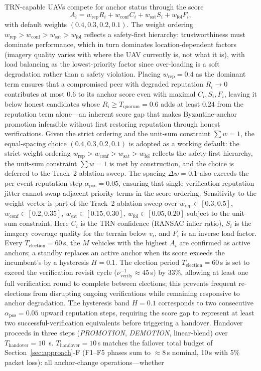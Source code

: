 \documentclass[conference,10pt]{IEEEtran}
\begin{document}
TRN-capable UAVs compete for anchor status through the score
\begin{equation}
A_i = w_\text{rep} R_i + w_\text{conf} C_i + w_\text{sat} S_i + w_\text{fol} F_i,
\label{eq:anchor_score}
\end{equation}
with default weights $(0.4, 0.3, 0.2, 0.1)$. The weight ordering $w_\text{rep} > w_\text{conf} > w_\text{sat} > w_\text{fol}$ reflects a safety-first hierarchy: trustworthiness must dominate performance, which in turn dominates location-dependent factors (imagery quality varies with where the UAV currently is, not what it is), with load balancing as the lowest-priority factor since over-loading is a soft degradation rather than a safety violation. Placing $w_\text{rep}=0.4$ as the dominant term ensures that a compromised peer with degraded reputation $R_i\to 0$ contributes at most $0.6$ to its anchor score even with maximal $C_i, S_i, F_i$, leaving it below honest candidates whose $R_i\geq T_\text{quorum}=0.6$ adds at least $0.24$ from the reputation term alone---an inherent score gap that makes Byzantine-anchor promotion infeasible without first restoring reputation through honest verifications. Given the strict ordering and the unit-sum constraint $\sum w = 1$, the equal-spacing choice $(0.4, 0.3, 0.2, 0.1)$ is adopted as a working default: the strict weight ordering $w_\text{rep} > w_\text{conf} > w_\text{sat} > w_\text{fol}$ reflects the safety-first hierarchy, the unit-sum constraint $\sum w = 1$ is met by construction, and the choice is deferred to the Track~2 ablation sweep. The spacing $\Delta w = 0.1$ also exceeds the per-event reputation step $\alpha_\text{pos}=0.05$, ensuring that single-verification reputation jitter cannot swap adjacent priority terms in the score ordering. Sensitivity to the weight vector is part of the Track~2 ablation sweep over $w_\text{rep}\in[0.3, 0.5]$, $w_\text{conf}\in[0.2, 0.35]$, $w_\text{sat}\in[0.15, 0.30]$, $w_\text{fol}\in[0.05, 0.20]$ subject to the unit-sum constraint. Here $C_i$ is the TRN confidence (RANSAC inlier ratio), $S_i$ is the imagery coverage quality for the terrain below $v_i$, and $F_i$ is an inverse load factor. Every $T_\text{election} = 60$\,s, the $M$ vehicles with the highest $A_i$ are confirmed as active anchors; a standby replaces an active anchor when its score exceeds the incumbent's by a hysteresis $H = 0.1$. The election period $T_\text{election}=60$\,s is set to exceed the verification revisit cycle ($\nu_\text{verify}^{-1}\approx 45$\,s) by 33\%, allowing at least one full verification round to complete between elections; this prevents frequent re-elections from disrupting ongoing verifications while remaining responsive to anchor degradation. The hysteresis band $H=0.1$ corresponds to two consecutive $\alpha_\text{pos}=0.05$ upward reputation steps, requiring the score gap to represent at least two successful-verification equivalents before triggering a handover. Handover proceeds in three steps (\emph{PROMOTION}, \emph{DEMOTION}, linear-blend) over $T_\text{handover} = 10$~s. $T_\text{handover}=10$\,s matches the failover total budget of Section~\ref{sec:approach}-F (F1--F5 phases sum to $\approx 8$\,s nominal, 10\,s with 5\% packet loss): all anchor-change operations---whether 
\end{document}
